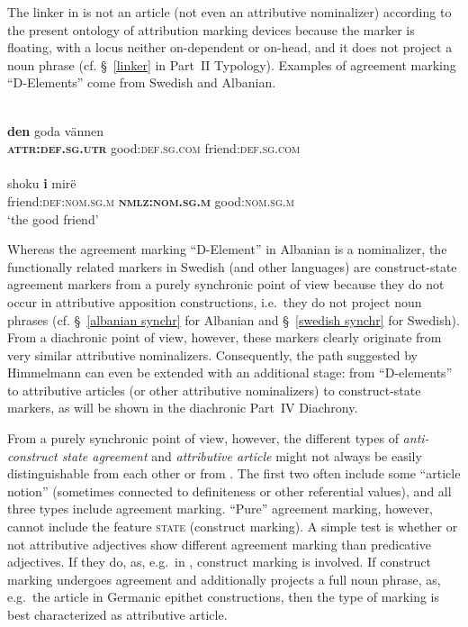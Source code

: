 The linker in  is not an article (not even an attributive nominalizer) according to the present ontology of attribution marking devices because the marker is floating, with a locus neither on-dependent or on-head, and it does not project a noun phrase (cf. \S~\ref{linker} in Part~II Typology). Examples of agreement marking “D-Elements” come from Swedish and Albanian.
\begin{exe}
\ex
\begin{xlist}
\ex 
{}\\
\gll	\textbf{den} goda vännen\\
	\textbf{\textsc{attr:def.sg.utr}} good:\textsc{def.sg.com} friend:\textsc{def.sg.com}\\
\ex 
{}\\
\gll	shoku \textbf{i} mirë\\
	friend:\textsc{def:nom.sg.m} \textbf{\textsc{nmlz:nom.sg.m}} good:\textsc{nom.sg.m}\\
\glt	‘the good friend’
\end{xlist}
\end{exe}
Whereas the agreement marking “D-Element” in Albanian is a nominalizer, the functionally related markers in Swedish (and other languages) are construct-state agreement markers from a purely synchronic point of view because they do not occur in attributive apposition constructions, i.e.~they do not project noun phrases (cf. \S~\ref{albanian synchr} for Albanian and \S~\ref{swedish synchr} for Swedish). From a diachronic point of view, however, these markers clearly originate from very similar attributive nominalizers. Consequently, the  path suggested by Himmelmann \citeyear{himmelmann1997} can even be extended with an additional stage: from “D-elements” to attributive articles (or other attributive nominalizers) to construct-state markers, as will be shown in the diachronic Part~IV Diachrony.

From a purely synchronic point of view, however, the different types of \emph{anti\hyp{}construct state agreement} and \emph{attributive article} might not always be easily distinguishable from each other or from \emph{}. The first two often include some “article notion” (sometimes connected to definiteness or other referential values), and all three types include agreement marking. “Pure” agreement marking, however, cannot include the feature \textsc{state} (construct marking). A simple test is whether or not attributive adjectives show different agreement marking than predicative adjectives. If they do, as, e.g.~in , construct marking is involved. If construct marking undergoes agreement and additionally projects a full noun phrase, as, e.g.~the article in Germanic epithet constructions, then the type of marking is best characterized as attributive article.

